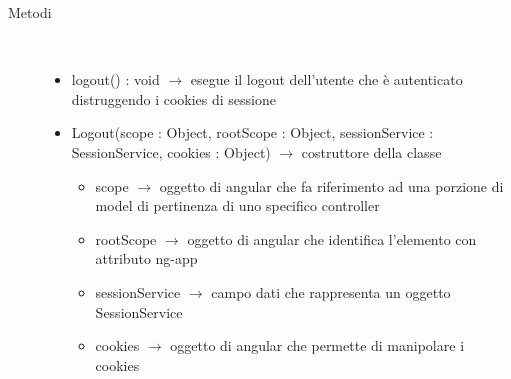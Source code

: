 \begin{description}
\item[Metodi] \hfill \\
\vspace{-7mm}
\begin{itemize}
	\item logout() : void $\rightarrow$ esegue il logout dell'utente che è autenticato distruggendo i cookies di sessione
	\item Logout(scope : Object, rootScope : Object, sessionService : SessionService, cookies : Object) $\rightarrow$ costruttore della classe\begin{itemize}
		\item scope $\rightarrow$ oggetto di angular che fa riferimento ad una porzione di model di pertinenza di uno specifico controller
		\item rootScope $\rightarrow$ oggetto di angular che identifica l’elemento con attributo ng-app
		\item sessionService $\rightarrow$ campo dati che rappresenta un oggetto SessionService
		\item cookies $\rightarrow$ oggetto di angular che permette di manipolare i cookies
	\end{itemize}
	
\end{itemize}

\end{description}

